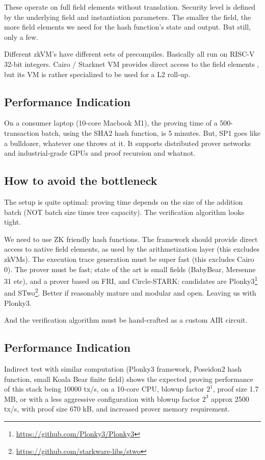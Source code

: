 \documentclass[twocolumn]{article}
\begin{document}
These operate on full field elements without translation. Security level is defined by the underlying field and instantiation parameters. The smaller the field, the more field elements we need for the hash function's state and output. But still, only a few.

Different zkVM's have different sets of precompiles. Basically all run on RISC-V 32-bit integers. Cairo / Starknet VM provides direct access to the field elements , but its VM is rather specialized to be used for a L2 roll-up.


\subsection{Performance Indication}

On a consumer laptop (10-core Macbook M1), the proving time of a 500-transaction batch, using the SHA2 hash function, is 5 minutes. But, SP1 goes like a bulldozer, whatever one throws at it. It supports distributed prover networks and industrial-grade GPUs and proof recursion and whatnot.


\subsection{How to avoid the bottleneck}

The setup is quite optimal: proving time depends on the size of the addition batch (NOT batch size times tree capacity). The verification algorithm looks tight.

We need to use ZK friendly hash functions. The framework should provide direct access to native field elements, as used by the arithmetization layer (this excludes zkVMs). The execution trace generation must be super fast (this excludes Cairo 0). The prover must be fast; state of the art is small fields (BabyBear, Mersenne 31 etc), and a prover based on FRI, and Circle-STARK: candidates are Plonky3\footnote{\url{https://github.com/Plonky3/Plonky3}} and STwo\footnote{\url{https://github.com/starkware-libs/stwo}}. Better if reasonably mature and modular and open. Leaving us with Plonky3.

And the verification algorithm must be hand-crafted as a custom AIR circuit.

\subsection{Performance Indication}

Indirect test with similar computation (Plonky3 framework, Poseidon2 hash function, small Koala Bear finite field) shows the expected proving performance of this stack being 10000 tx/s, on a 10-core CPU, blowup factor $2^1$, proof size 1.7 MB, or with a less aggressive configuration with blowup factor $2^3$ approx 2500 tx/s, with proof size 670 kB, and increased prover memory requirement.
\end{document}
